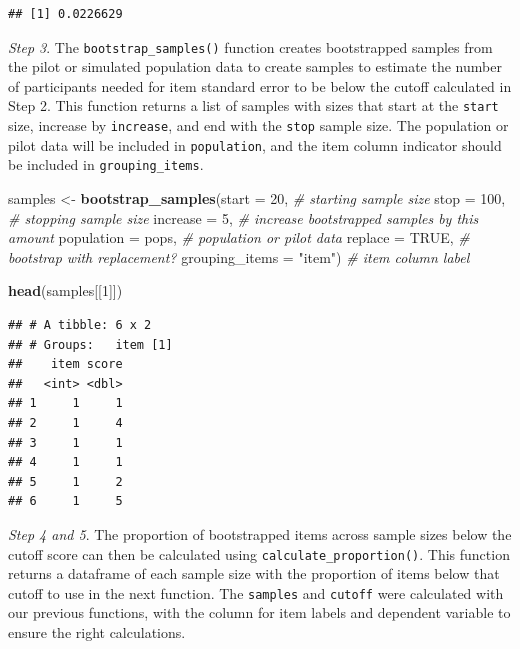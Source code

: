 \documentclass[
  man]{apa7}
\newenvironment{Shaded}{\begin{snugshade}}{\end{snugshade}}
\newcommand{\AttributeTok}[1]{\textcolor[rgb]{0.13,0.29,0.53}{#1}}
\newcommand{\CommentTok}[1]{\textcolor[rgb]{0.56,0.35,0.01}{\textit{#1}}}
\newcommand{\ConstantTok}[1]{\textcolor[rgb]{0.56,0.35,0.01}{#1}}
\newcommand{\DecValTok}[1]{\textcolor[rgb]{0.00,0.00,0.81}{#1}}
\newcommand{\FunctionTok}[1]{\textcolor[rgb]{0.13,0.29,0.53}{\textbf{#1}}}
\newcommand{\NormalTok}[1]{#1}
\newcommand{\OtherTok}[1]{\textcolor[rgb]{0.56,0.35,0.01}{#1}}
\newcommand{\SpecialCharTok}[1]{\textcolor[rgb]{0.81,0.36,0.00}{\textbf{#1}}}
\newcommand{\StringTok}[1]{\textcolor[rgb]{0.31,0.60,0.02}{#1}}
\begin{document}
\begin{Shaded}
\end{Shaded}

\begin{verbatim}
## [1] 0.0226629
\end{verbatim}

\emph{Step 3}. The \texttt{bootstrap\_samples()} function creates bootstrapped samples from the pilot or simulated population data to create samples to estimate the number of participants needed for item standard error to be below the cutoff calculated in Step 2. This function returns a list of samples with sizes that start at the \texttt{start} size, increase by \texttt{increase}, and end with the \texttt{stop} sample size. The population or pilot data will be included in \texttt{population}, and the item column indicator should be included in \texttt{grouping\_items}.

\begin{Shaded}
\begin{Highlighting}[]
\NormalTok{samples }\OtherTok{\textless{}{-}} \FunctionTok{bootstrap\_samples}\NormalTok{(}\AttributeTok{start =} \DecValTok{20}\NormalTok{, }\CommentTok{\# starting sample size}
  \AttributeTok{stop =} \DecValTok{100}\NormalTok{, }\CommentTok{\# stopping sample size}
  \AttributeTok{increase =} \DecValTok{5}\NormalTok{, }\CommentTok{\# increase bootstrapped samples by this amount}
  \AttributeTok{population =}\NormalTok{ pops, }\CommentTok{\# population or pilot data}
  \AttributeTok{replace =} \ConstantTok{TRUE}\NormalTok{, }\CommentTok{\# bootstrap with replacement? }
  \AttributeTok{grouping\_items =} \StringTok{"item"}\NormalTok{) }\CommentTok{\# item column label  }

\FunctionTok{head}\NormalTok{(samples[[}\DecValTok{1}\NormalTok{]])}
\end{Highlighting}
\end{Shaded}

\begin{verbatim}
## # A tibble: 6 x 2
## # Groups:   item [1]
##    item score
##   <int> <dbl>
## 1     1     1
## 2     1     4
## 3     1     1
## 4     1     1
## 5     1     2
## 6     1     5
\end{verbatim}

\emph{Step 4 and 5}. The proportion of bootstrapped items across sample sizes below the cutoff score can then be calculated using \texttt{calculate\_proportion()}. This function returns a dataframe of each sample size with the proportion of items below that cutoff to use in the next function. The \texttt{samples} and \texttt{cutoff} were calculated with our previous functions, with the column for item labels and dependent variable to ensure the right calculations.
\end{document}
